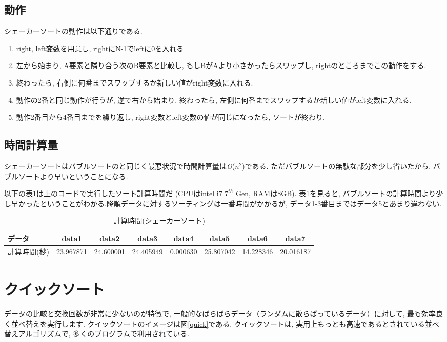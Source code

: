 \documentclass[a4j, titlepage]{jarticle}
\begin{document}
\subsection{動作}
シェーカーソートの動作は以下通りである.
\begin{enumerate}
\item right, left変数を用意し, rightにN-1でleftに0を入れる
\item 左から始まり, A要素と隣り合う次のB要素と比較し, もしBがAより小さかったらスワップし, rightのところまでこの動作をする.　
\item 終わったら, 右側に何番までスワップするか新しい値がright変数に入れる.
\item 動作の2番と同じ動作が行うが, 逆で右から始まり, 終わったら, 左側に何番までスワップするか新しい値がleft変数に入れる.
\item 動作2番目から4番目までを繰り返し, right変数とleft変数の値が同じになったら, ソートが終わり. 
\end{enumerate}

\subsection{時間計算量}
シェーカーソートはバブルソートのと同じく最悪状況で時間計算量は\textit{O}($n^2$)である. ただバブルソートの無駄な部分を少し省いたから, バブルソートより早いということになる.

以下の表\ref{table:shaker}は上のコードで実行したソート計算時間だ (CPUはintel i7 $7^{th}$ Gen, RAMは8GB). 
表\ref{table:shaker}を見ると, バブルソートの計算時間より少し早かったということがわかる.降順データに対するソーティングは一番時間がかかるが, データ1-3番目まではデータ5とあまり違わない.
\begin{table}[bth]
\label{table:shaker}
\caption{計算時間(シェーカーソート)}
\begin{center}
\begin{tabular}{|l|ccccccc|}
\hline
データ & data1 & data2 &data3 &data4 &data5 &data6 &data7 \\ \hline
計算時間(秒) & 23.967871 & 24.600001 & 24.405949 & \cellcolor{green!20}0.000630 &  \cellcolor{red!20}25.807042 & 14.228346 & 20.016187\\ \hline
\end{tabular}
\end{center}
\end{table} 
\pagebreak

\section{クイックソート}
データの比較と交換回数が非常に少ないのが特徴で, 一般的なばらばらデータ（ランダムに散らばっているデータ）に対して, 最も効率良く並べ替えを実行します. クイックソートのイメージは図\ref{quick}である. 
クイックソートは, 実用上もっとも高速であるとされている並べ替えアルゴリズムで, 多くのプログラムで利用されている.
\end{document}
